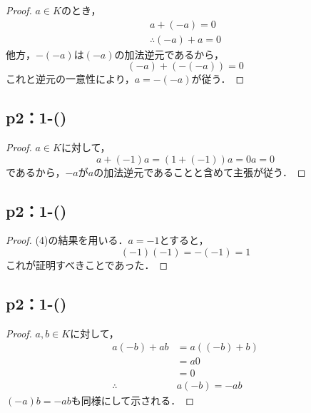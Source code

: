 \documentclass[a4paper,10pt,fleqn]{ltjsarticle}
\begin{document}
\begin{leftbar}
    \begin{proof}
        $a \in K$のとき，
        \begin{gather*}
            a+(-a)=0 \\
            \therefore (-a)+a =0
        \end{gather*}
        他方，$-(-a)$は$(-a)$の加法逆元であるから，
        \[
            (-a)+(-(-a))=0
        \]
        これと逆元の一意性により，$a=-(-a)$が従う．
    \end{proof}
\end{leftbar}

\subsection*{p2：1-()}
\begin{leftbar}
    \begin{proof}
        $a \in K$に対して，
        \[
            a+(-1)a=(1+(-1))a =0a =0
        \]
        であるから，$-a$が$a$の加法逆元であることと含めて主張が従う．
    \end{proof}
\end{leftbar}

\newpage

\subsection*{p2：1-()}
\begin{leftbar}
    \begin{proof}
        (4)の結果を用いる．$a=-1$とすると，
        \[
            (-1)(-1)=-(-1)=1
        \]
        これが証明すべきことであった．
    \end{proof}
\end{leftbar}
\subsection*{p2：1-()}

\begin{leftbar}
    \begin{proof}
        $a,b \in K$に対して，
        \begin{align*}
            a(-b)+ab         & = a((-b)+b) \\
                             & = a0        \\
                             & =0          \\
            \therefore \quad & a(-b)=-ab
        \end{align*}
        $(-a)b = -ab$も同様にして示される．
    \end{proof}
\end{leftbar}
\end{document}
